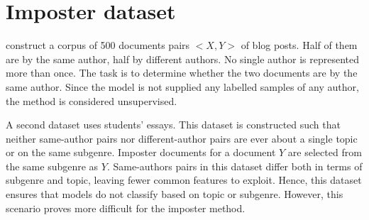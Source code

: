 \section{Imposter dataset}
\label{sec:imposter_dataset}

\citet{koppel_determining_2014} construct a corpus of 500 documents pairs $<X,Y>$ of blog posts.
Half of them are by the same author, half by different authors.
No single author is represented more than once.
The task is to determine whether the two documents are by the same author.
Since the model is not supplied any labelled samples of any author, the method is considered unsupervised.

A second dataset uses students' essays.
This dataset is constructed such that neither same-author pairs nor different-author pairs 
are ever about a single topic or on the same subgenre.
Imposter documents for a document $Y$ are selected from the same subgenre as $Y$.
Same-authors pairs in this dataset differ both in terms of subgenre and topic, leaving fewer common features to exploit.
Hence, this dataset ensures that models do not classify based on topic or subgenre.
However, this scenario proves more difficult for the imposter method.